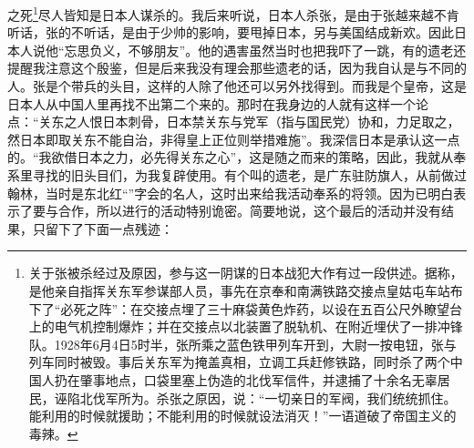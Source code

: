 之死\footnote{关于张被杀经过及原因，参与这一阴谋的日本战犯大作有过一段供述。据称，是他亲自指挥关东军参谋部人员，事先在京奉和南满铁路交接点皇姑屯车站布下了“必死之阵”：在交接点埋了三十麻袋黄色炸药，以设在五百公尺外瞭望台上的电气机控制爆炸；并在交接点以北装置了脱轨机、在附近埋伏了一排冲锋队。1928年6月4日5时半，张所乘之蓝色铁甲列车开到，大尉一按电钮，张与列车同时被毁。事后关东军为掩盖真相，立调工兵赶修铁路，同时杀了两个中国人扔在肇事地点，口袋里塞上伪造的北伐军信件，并逮捕了十余名无辜居民，诬陷北伐军所为。杀张之原因，说：“一切亲日的军阀，我们统统抓住。能利用的时候就援助；不能利用的时候就设法消灭！”一语道破了帝国主义的毒辣。}尽人皆知是日本人谋杀的。我后来听说，日本人杀张，是由于张越来越不肯听话，张的不听话，是由于少帅的影响，要甩掉日本，另与美国结成新欢。因此日本人说他“忘思负义，不够朋友”。他的遇害虽然当时也把我吓了一跳，有的遗老还提醒我注意这个殷鉴，但是后来我没有理会那些遗老的话，因为我自认是与不同的人。张是个带兵的头目，这样的人除了他还可以另外找得到。而我是个皇帝，这是日本人从中国人里再找不出第二个来的。那时在我身边的人就有这样一个论点：“关东之人恨日本刺骨，日本禁关东与党军（指与国民党）协和，力足取之，然日本即取关东不能自治，非得皇上正位则举措难施”。我深信日本是承认这一点的。“我欲借日本之力，必先得关东之心”，这是随之而来的策略，因此，我就从奉系里寻找的旧头目们，为我复辟使用。有个叫的遗老，是广东驻防旗人，从前做过翰林，当时是东北红“”字会的名人，这时出来给我活动奉系的将领。因为已明白表示了要与合作，所以进行的活动特别诡密。简要地说，这个最后的活动并没有结果，只留下了下面一点残迹：\\


